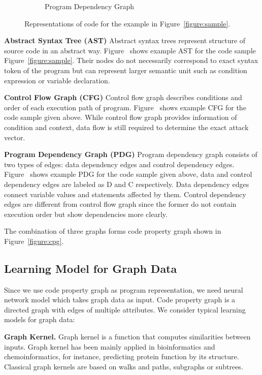 \begin{figure}[ht]
\begin{subfigure}[t]{0.3\textwidth}
		\caption{Program Dependency Graph}
		\label{figure:pdg}
	\end{subfigure}
	\caption{Representations of code for the example in Figure~\ref{figure:sample}.}
\end{figure}

\textbf{Abstract Syntax Tree (AST)} Abstract syntax trees represent structure of source code in an abstract way.
Figure~ shows example AST for the code sample Figure~\ref{figure:sample}.
Their nodes do not necessarily correspond to exact syntax token of the program but can represent larger semantic unit such as condition expression or variable declaration.

\textbf{Control Flow Graph (CFG)} Control flow graph describes conditions and order of each execution path of program.
Figure~ shows example CFG for the code sample given above.
While control flow graph provides information of condition and context, data flow is still required to determine the exact attack vector.

\textbf{Program Dependency Graph (PDG)} Program dependency graph consists of two types of edges: data dependency edges and control dependency edges.
Figure~ shows example PDG for the code sample given above, data and control dependency edges are labeled as D and C respectively.
Data dependency edges connect variable values and statements affected by them.
Control dependency edges are different from control flow graph since the former do not contain execution order but show dependencies more clearly.

The combination of three graphs forms code property graph shown in Figure~\ref{figure:cpg}.

\subsection{Learning Model for Graph Data}

Since we use code property graph as program representation, we need neural network model which takes graph data as input.
Code property graph is a directed graph with edges of multiple attributes.
We consider typical learning models for graph data:

\textbf{Graph Kernel.} Graph kernel is a function that computes similarities between inputs.
Graph kernel has been mainly applied in bioinformatics and chemoinformatics, for instance, predicting protein function by its structure.
Classical graph kernels are based on walks and paths, subgraphs or subtrees.

